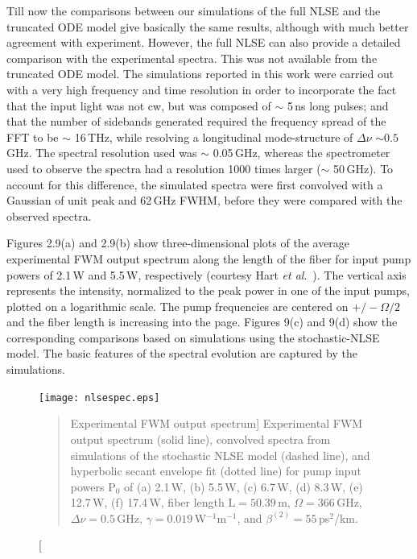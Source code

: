 Till now the comparisons between our simulations of the full NLSE and the
truncated ODE model give basically the same results, although with much better
agreement with experiment. However, the full NLSE can also provide a detailed
comparison with the experimental spectra. This was not available from the
truncated ODE model. The simulations reported in this work were carried out
with a very high frequency and time resolution in order to incorporate the
fact that the input light was not cw, but was composed of $\sim$ 5\,ns long
pulses; and that the number of sidebands generated required the frequency
spread of the FFT to be $\sim$ 16\,THz, while resolving a longitudinal
mode-structure of $\Delta\nu$ $\sim 0.5$\,GHz. The spectral resolution used was
$\sim$ 0.05\,GHz, whereas the spectrometer used to observe the spectra had a
resolution 1000 times larger ($\sim$ 50\,GHz). To account for this difference,
the simulated spectra were first convolved with a Gaussian of unit peak and
62\,GHz FWHM, before they were compared with the observed spectra.

Figures 2.9(a) and 2.9(b) show three-dimensional plots of the average experimental
FWM output spectrum along the length of the fiber for input pump powers of 2.1\,W and 5.5\,W,
 respectively (courtesy Hart {\it et al}.\ \cite{hart1}). The vertical
axis represents the intensity, normalized to the peak power in one of the
input pumps, plotted on a logarithmic scale. The pump frequencies are centered
on $+/-\Omega/2$ and the fiber length is increasing into the page. Figures
9(c) and 9(d) show the corresponding comparisons based on simulations using
the stochastic-NLSE model. The basic features of the spectral evolution are
captured by the simulations.

\begin{figure}
\begin{center}
\texttt{[image: nlsespec.eps]}
\end{center}
\renewcommand{\baselinestretch}{1}
\small\normalsize
\begin{quote}
\caption
[Experimental FWM output spectrum]
{Experimental FWM output spectrum (solid line), convolved spectra from simulations of the stochastic NLSE model (dashed line), and hyperbolic secant envelope fit (dotted line) for pump input powers P$_0$ of (a) 2.1\,W, (b) 5.5\,W, (c) 6.7\,W, (d) 8.3\,W, (e) 12.7\,W, (f) 17.4\,W, fiber length L$= 50.39$\,m, $\Omega = 366$\,GHz, $\Delta\nu = 0.5$\,GHz, $\gamma = 0.019$\,W$^{-1}$m$^{-1}$, and $\beta^{(2)} = 55$\,ps$^2$/km.}
\label{fig2.10}
\end{quote}
\end{figure}
\renewcommand{\baselinestretch}{2}
\small\normalsize

